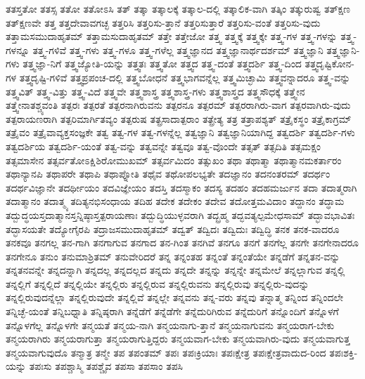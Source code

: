 {ತತಸ್ತತೋ
ತತಸ್ಸ
ತತೋ
ತತೋಽಸಿ
ತತ್
ತತ್ಕಾ
ತತ್ಕಾಲಕ್ಕೆ
ತತ್ಕಾಲ-ದಲ್ಲಿ
ತತ್ಕಾಲಿಕ-ವಾಗಿ
ತತ್ಕಿಂ
ತತ್ಕುರುಷ್ವ
ತತ್ಕ್ಷಣ
ತತ್ಕ್ಷಣವೇ
ತತ್ತ
ತತ್ತದೇವಾವಗಚ್ಛ
ತತ್ತರಿಸಿ
ತತ್ತರಿಸು-ತ್ತಾನೆ
ತತ್ತರಿಸುತ್ತಾರೆ
ತತ್ತರಿಸು-ವಂತೆ
ತತ್ತರಿಸು-ವುದು
ತತ್ತಾಮಸಮುದಾಹೃತಮ್
ತತ್ತಾಮಸುದಾಹೃತಮ್
ತತ್ತೇ
ತತ್ತೇಜೋ
ತತ್ತ್ವ
ತತ್ತ್ವಕ್ಕೆ
ತತ್ತ್ವಕ್ಕೇ
ತತ್ತ್ವ-ಗಳ
ತತ್ತ್ವ-ಗಳನ್ನು
ತತ್ತ್ವ-ಗಳನ್ನೂ
ತತ್ತ್ವ-ಗಳಿವೆ
ತತ್ತ್ವ-ಗಳು
ತತ್ತ್ವ-ಗಳೂ
ತತ್ತ್ವ-ಗಳೆಲ್ಲ
ತತ್ತ್ವಜ್ಞಾನದ
ತತ್ತ್ವಜ್ಞಾನಾರ್ಥದರ್ಶಮ್
ತತ್ತ್ವಜ್ಞಾನಿ
ತತ್ತ್ವಜ್ಞಾನಿ-ಗಳು
ತತ್ತ್ವಜ್ಞಾ-ನಿಗೆ
ತತ್ತ್ವಜ್ಯೋತಿ-ಯನ್ನು
ತತ್ತ್ವತಃ
ತತ್ತ್ವತೋ
ತತ್ತ್ವದ
ತತ್ತ್ವ-ದಂತೆ
ತತ್ತ್ವದರ್ಶಿ
ತತ್ತ್ವ-ದಿಂದ
ತತ್ತ್ವದೃಷ್ಟಿಕೋನ-ಗಳ
ತತ್ತ್ವದೃಷ್ಟಿ-ಗಳಿವೆ
ತತ್ತ್ವಪ್ರಪಂಚ-ದಲ್ಲಿ
ತತ್ತ್ವಬೋಧನೆ
ತತ್ತ್ವಭಾಗವನ್ನೆಲ್ಲ
ತತ್ತ್ವಮಿಚ್ಛಾಮಿ
ತತ್ತ್ವವನ್ನಾದರೂ
ತತ್ತ್ವ-ವನ್ನು
ತತ್ತ್ವವಿತ್
ತತ್ತ್ವ-ವಿತ್ತು
ತತ್ತ್ವ-ವಿದೆ
ತತ್ತ್ವವೇ
ತತ್ತ್ವಶಾಸ್ತ್ರ
ತತ್ತ್ವಶಾಸ್ತ್ರ-ಗಳು
ತತ್ತ್ವಶಾಸ್ತ್ರದ
ತತ್ತ್ವಸೌಧಕ್ಕೆ
ತತ್ತ್ವೇನ
ತತ್ತ್ವೇನಾತಶ್ಚ್ಯವಂತಿ
ತತ್ಪರಃ
ತತ್ಪರತೆ
ತತ್ಪರನಾಗಿರುವನು
ತತ್ಪರನೂ
ತತ್ಪರಮ್
ತತ್ಪರರಾಗಿರು-ವಾಗ
ತತ್ಪರವಾಗಿರು-ವುದು
ತತ್ಪರಾಯಣರಾಗಿ
ತತ್ಪರಿಮಾರ್ಗಿತವ್ಯಂ
ತತ್ಪರುಷ
ತತ್ಪ್ರಸಾದಾತ್ಪರಾಂ
ತತ್ಪ್ರೇತ್ಯ
ತತ್ರ
ತತ್ರಾಪಶ್ಯತ್
ತತ್ರೈಕಸ್ಥಂ
ತತ್ರೈಕಾಗ್ರಮ್
ತತ್ರೈವಂ
ತತ್ರೈವಾವ್ಯಕ್ತಸಂಜ್ಞಕೇ
ತತ್ವ
ತತ್ವ-ಗಳ
ತತ್ವ-ಗಳನ್ನೆಲ್ಲ
ತತ್ವಜ್ಞಾನಿ
ತತ್ವಜ್ಞಾನಿಯಾಗಿದ್ದ
ತತ್ವದರ್ಶಿ
ತತ್ವದರ್ಶಿ-ಗಳು
ತತ್ವದರ್ಶಿಯ
ತತ್ವದರ್ಶಿ-ಯಂತೆ
ತತ್ವ-ವನ್ನು
ತತ್ವವನ್ನೇ
ತತ್ವವೂ
ತತ್ವ-ವೊಂದೇ
ತತ್ಸತ್
ತತ್ಸದಿತಿ
ತತ್ಸಮಕ್ಷಂ
ತತ್ಸಮಾಸೇನ
ತತ್ಸರ್ವತೋಽಕ್ಷಿಶಿರೋಮುಖಮ್
ತತ್ಸರ್ವಮಿದಂ
ತತ್ಸುಖಂ
ತಥಾ
ತಥಾತ್ಮಾ
ತಥಾತ್ಮಾನಮಕರ್ತಾರಂ
ತಥಾನ್ಯಾನಪಿ
ತಥಾಪರೇ
ತಥಾಪಿ
ತಥಾಪ್ನೋತಿ
ತಥೈವ
ತಥೋಪಲಭ್ಯತೇ
ತದಜ್ಞಾನಂ
ತದನಂತರಮ್
ತದರ್ಥಂ
ತದರ್ಥವಿಜ್ಞಾನೇ
ತದರ್ಥೀಯಂ
ತದವಿಜ್ಞೇಯಂ
ತದಸ್ತಿ
ತದಸ್ಮಾಕಂ
ತದಸ್ಯ
ತದಹಂ
ತದಹಮರ್ಜುನ
ತದಾ
ತದಾತ್ಮರಾಗಿ
ತದಾತ್ಮಾನಂ
ತದಾತ್ಮ್ಯ
ತದಿತ್ಯನಭಿಸಂಧಾಯ
ತದಿಹ
ತದೇಕ
ತದೇಕಂ
ತದೇವ
ತದೋತ್ತಮವಿದಾಂ
ತದ್ದಾನಂ
ತದ್ಧಾಮ
ತದ್ಬುದ್ಧಯಸ್ತದಾತ್ಮಾನಸ್ತನ್ನಿಷ್ಠಾಸ್ತತ್ಪರಾಯಣಾಃ
ತದ್ಬುದ್ಧಿಯುಳ್ಳವರಾಗಿ
ತದ್ಬ್ರಹ್ಮ
ತದ್ಭವತ್ಯಲ್ಪಮೇಧಸಾಮ್
ತದ್ಭಾವಭಾವಿತಃ
ತದ್ಭಾಸಯತೇ
ತದ್ಯೋಗೈರಪಿ
ತದ್ರಾಜಸಮುದಾಹೃತಮ್
ತದ್ವತ್
ತದ್ವಿದಃ
ತದ್ವಿದುಃ
ತದ್ವಿದ್ಧಿ
ತನಕ
ತನಕ-ವಾದರೂ
ತನಕವೂ
ತನಗಲ್ಲ
ತನ-ಗಾಗಿ
ತನಗಾಗುವ
ತನಗಾದ
ತನ-ಗಿಂತ
ತನಗಿವೆ
ತನಗೂ
ತನಗೆ
ತನಗೆಲ್ಲ
ತನಗೇ
ತನಗೇನಾದರೂ
ತನಗೇನೂ
ತನುಂ
ತನುಮಾಶ್ರಿತಮ್
ತನುವೇರಿದರೆ
ತನ್ನ
ತನ್ನಂತಹ
ತನ್ನಂತೆ
ತನ್ನಂತೆಯೇ
ತನ್ನಡೆಗೆ
ತನ್ನತನ-ವನ್ನು
ತನ್ನತನವನ್ನೇ
ತನ್ನದನ್ನಾಗಿ
ತನ್ನದಲ್ಲ
ತನ್ನದಲ್ಲದ
ತನ್ನದು
ತನ್ನದೇ
ತನ್ನನ್ನು
ತನ್ನನ್ನೇ
ತನ್ನಮೇಲೆ
ತನ್ನಲ್ಲಾಗುವ
ತನ್ನಲ್ಲಿ
ತನ್ನಲ್ಲಿಗೆ
ತನ್ನಲ್ಲಿದೆ
ತನ್ನಲ್ಲಿಯೇ
ತನ್ನಲ್ಲಿರು
ತನ್ನಲ್ಲಿರುವ
ತನ್ನಲ್ಲಿರುವನು
ತನ್ನಲ್ಲಿರುವು
ತನ್ನಲ್ಲಿರು-ವುದನ್ನು
ತನ್ನಲ್ಲಿರುವುದನ್ನೆಲ್ಲಾ
ತನ್ನಲ್ಲಿರುವುದೇ
ತನ್ನಲ್ಲಿವೆ
ತನ್ನಲ್ಲೇ
ತನ್ನವನು
ತನ್ನ-ವರು
ತನ್ನವು
ತನ್ನಾತ್ಮ
ತನ್ನಿಂದ
ತನ್ನಿಂದಲೇ
ತನ್ನಿಚ್ಛೆ-ಯಂತೆ
ತನ್ನಿಬಧ್ನಾತಿ
ತನ್ನಿಷ್ಠರಾಗಿ
ತನ್ನೆಡೆಗೆ
ತನ್ನೆಡೆಗೇ
ತನ್ನೆದುರಿಗಿರುವ
ತನ್ನೆದುರಿಗೆ
ತನ್ನೊಂದಿಗೆ
ತನ್ನೊಳಗೆ
ತನ್ನೊಳಗೆಲ್ಲ
ತನ್ನೊಳಗೇ
ತನ್ಮಯತೆ
ತನ್ಮಯ-ನಾಗಿ
ತನ್ಮಯನಾಗು-ತ್ತಾನೆ
ತನ್ಮಯನಾಗುವನು
ತನ್ಮಯರಾಗ-ಬೇಕು
ತನ್ಮಯರಾಗಿರು
ತನ್ಮಯರಾಗುತ್ತಾ
ತನ್ಮಯರಾಗುತ್ತಿದ್ದರು
ತನ್ಮಯವಾಗ-ಬೇಕು
ತನ್ಮಯವಾಗಿರು-ವುದು
ತನ್ಮಯವಾಗುತ್ತ
ತನ್ಮಯವಾಗುವುದೊ
ತನ್ಮಾತ್ರ
ತನ್ಮೇ
ತಪ
ತಪಂತಮ್
ತಪಃ
ತಪಃಕ್ರಿಯಾಃ
ತಪಃಕ್ಷೇತ್ರ
ತಪಃಕ್ಷೇತ್ರವಾದುದ-ರಿಂದ
ತಪಃಶಕ್ತಿ-ಯನ್ನು
ತಪಃಸು
ತಪಶ್ಚಾಸ್ಮಿ
ತಪಶ್ಚೈವ
ತಪಸಾ
ತಪಸಾಂ
ತಪಸಿ
}
